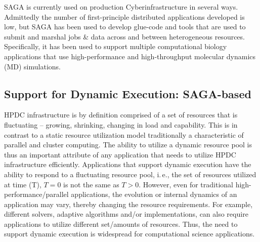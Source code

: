 \documentclass[]{svjour3}
\begin{document}
SAGA is currently used on production Cyberinfrastructure in several ways.
Admittedly the number of first-principle distributed applications developed is
low, but SAGA has been used to develop glue-code and tools that are
used to submit and marshal jobs \& data across and between
heterogeneous resources. Specifically, it has been used to support
multiple computational biology applications that use high-performance
and high-throughput molecular dynamics (MD) simulations.


\subsection{Support for Dynamic Execution: SAGA-based \pilotjob}

HPDC infrastructure is by definition comprised of a set of resources
that is fluctuating -- growing, shrinking, changing in load and
capability. This is in contrast to a static resource utilization model
traditionally a characteristic of parallel and cluster computing. The
ability to utilize a dynamic resource pool is thus an important
attribute of any application that needs to utilize HPDC infrastructure
efficiently. Applications that support dynamic execution have the
ability to respond to a fluctuating resource pool, i.\,e., the set of
resources utilized at time (T), $T=0$ is not the same as $T>0$.
However, even for traditional high-performance/parallel applications,
the evolution or internal dynamics of an application may vary, thereby
changing the resource requirements. For example, different solvers,
adaptive algorithms and/or implementations, can also require
applications to utilize different set/amounts of resources. Thus, the
need to support dynamic execution is widespread for computational
science applications. 
\end{document}
